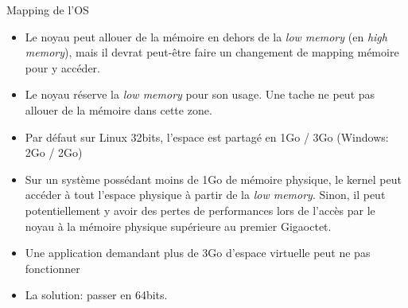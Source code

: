 \begin{frame}[fragile]{Mapping de l'OS}
  \begin{itemize}
  \item Le noyau peut allouer de  la mémoire en dehors de la \emph{low
      memory} (en \emph{high memory}),  mais il devrat peut-être faire
    un changement de mapping mémoire pour y accéder.
  \item  Le noyau  réserve la  \emph{low memory}  pour son  usage. Une
    tache ne peut pas allouer de la mémoire dans cette zone.
  \item Par défaut sur Linux 32bits, l'espace est partagé en 1Go / 3Go
    (Windows: 2Go / 2Go)
  \item Sur un système possédant  moins de 1Go de mémoire physique, le
    kernel  peut accéder  à  tout  l'espace physique  à  partir de  la
    \emph{low  memory}.  Sinon,  il peut  potentiellement y  avoir des
    pertes de performances  lors de l'accès par le  noyau à la mémoire
    physique supérieure au premier Gigaoctet.
  \item Une application demandant  plus de 3Go d'espace virtuelle peut
    ne pas fonctionner
  \item La solution: passer en 64bits.
  \end{itemize}
\end{frame}

